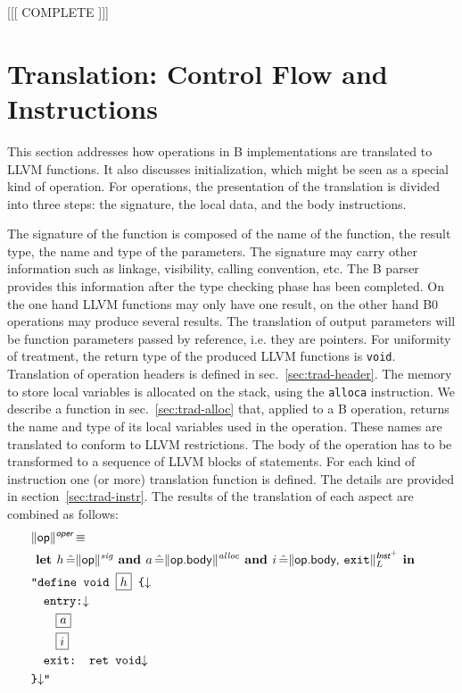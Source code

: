 \documentclass{llncs}
\newcommand{\trad}[2]{\ensuremath{\lVert \textsf{#1} \rVert^{\textit{#2}}}}
\newcommand{\nl}[0]{\ensuremath{\downarrow}}
\DeclareMathOperator{\isdef}{\equiv}
\newcommand{\llvm}[1]{\texttt{#1}}
\newcommand{\B}[1]{\textsf{#1}}
\newcommand{\ListOf}[1]{$\mbox{#1}^+$}
\newcommand{\LET}[0]{\textbf{ let }}
\DeclareMathOperator{\BE}{\hat{=}}
\newcommand{\IN}[0]{\textbf{ in }}
\newcommand{\AND}[0]{\textbf{ and }}
\newcommand{\PH}[1]{\framebox{$#1$}}
\begin{document}
[[[ COMPLETE ]]]

\section{Translation: Control Flow and Instructions
\label{sec:control}}

This section addresses how operations in B implementations are translated to
LLVM functions. It also discusses initialization, which might be seen as a
special kind of operation. For operations, the presentation of the translation
is divided into three steps: the signature, the local data, and the body
instructions.

The signature of the function is composed of the name of the function, the
result type, the name and type of the parameters. The signature may carry other
information such as linkage, visibility, calling convention, etc. The B parser
provides this information after the type checking phase has been completed.  On
the one hand LLVM functions may only have one result, on the other hand B0
operations may produce several results. The translation of output parameters
will be function parameters passed by reference, i.e. they are pointers. For
uniformity of treatment, the return type of the produced LLVM functions is
\llvm{void}. Translation of operation headers is defined in
sec.~\ref{sec:trad-header}. The memory to store local variables is allocated on
the stack, using the \llvm{alloca} instruction. We describe a function in
sec.~\ref{sec:trad-alloc} that, applied to a B operation, returns the name and
type of its local variables used in the operation. These names are translated to
conform to LLVM restrictions. The body of the operation has to be transformed to
a sequence of LLVM blocks of statements. For each kind of instruction one (or
more) translation function is defined. The details are provided in
section~\ref{sec:trad-instr}.  The results of the translation of each aspect are
combined as follows:
\begin{align*}
\begin{split}
  \lefteqn{\trad{\B{op}}{\B{oper}} \isdef} \\
  & \LET h \BE \trad{\B{op}}{sig} \AND   a \BE \trad{\B{op.body}}{alloc} \AND i \BE \trad{\B{op.body}, \llvm{exit}}{\ListOf{\B{Inst}}}_L \IN  \\
  & \llvm{"define void \PH{h} \{\nl} \\
  & \quad \llvm{entry:\nl} \\
  & \quad \quad \PH{a} \\
  & \quad \quad \PH{i} \\
  & \quad \llvm{exit: ret void\nl} \\
  & \llvm{\}\nl"}
\end{split}
\end{align*}
\end{document}
